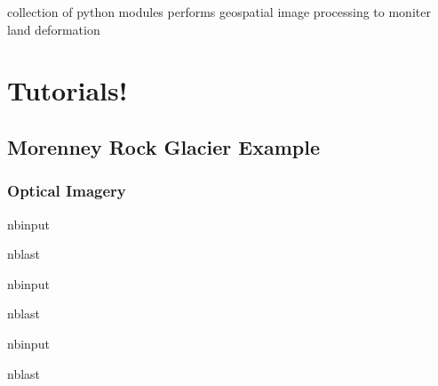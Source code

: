 \documentclass[letterpaper,10pt,english]{sphinxmanual}
\begin{document}
\sphinxAtStartPar
collection of python modules performs geospatial image processing to moniter land deformation


\chapter{Tutorials!}
\label{\detokenize{index:tutorials}}
\sphinxstepscope


\section{Morenney Rock Glacier Example}
\label{\detokenize{notebooks/RockGlacier_optical:Morenney-Rock-Glacier-Example}}\label{\detokenize{notebooks/RockGlacier_optical::doc}}

\subsection{Optical Imagery}
\label{\detokenize{notebooks/RockGlacier_optical:Optical-Imagery}}
\begin{sphinxuseclass}{nbinput}
\begin{sphinxuseclass}{nblast}
{
\begin{sphinxVerbatim}[commandchars=\\\{\}]
\llap{\color{nbsphinxin}[ ]:\,\hspace{\fboxrule}\hspace{\fboxsep}}
\end{sphinxVerbatim}
}

\end{sphinxuseclass}
\end{sphinxuseclass}
\begin{sphinxuseclass}{nbinput}
\begin{sphinxuseclass}{nblast}
{
\begin{sphinxVerbatim}[commandchars=\\\{\}]
\llap{\color{nbsphinxin}[ ]:\,\hspace{\fboxrule}\hspace{\fboxsep}}
\end{sphinxVerbatim}
}

\end{sphinxuseclass}
\end{sphinxuseclass}
\begin{sphinxuseclass}{nbinput}
\begin{sphinxuseclass}{nblast}
{
\begin{sphinxVerbatim}[commandchars=\\\{\}]
\llap{\color{nbsphinxin}[ ]:\,\hspace{\fboxrule}\hspace{\fboxsep}}
\end{sphinxVerbatim}
}

\end{sphinxuseclass}
\end{sphinxuseclass}
\end{document}
